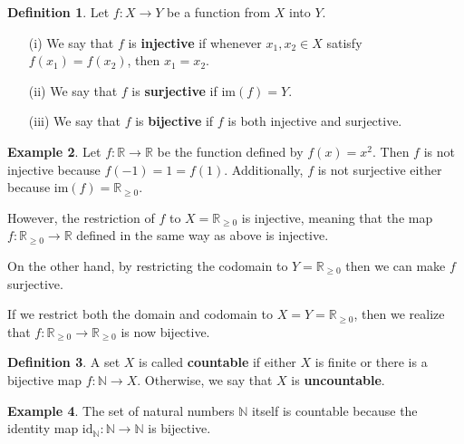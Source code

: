 \documentclass[12pt]{article}
\theoremstyle{definition}
\newtheorem{definition}{Definition}
\newtheorem{example}[definition]{Example}
\theoremstyle{theorem}
\begin{document}
\begin{definition}
Let $f : X \to Y$ be a function from $X$ into $Y$. 
\begin{enumerate}
\item[(i)] We say that $f$ is \textbf{injective} if whenever $x_1, x_2 \in X$ satisfy $f(x_1) = f(x_2)$, then $x_1 = x_2$. 
\item[(ii)] We say that $f$ is \textbf{surjective} if $\text{im}(f) = Y$. 
\item[(iii)] We say that $f$ is \textbf{bijective} if $f$ is both injective and surjective. 
\end{enumerate}
\end{definition}

\begin{example}
Let $f : \mathbb{R} \to \mathbb{R}$ be the function defined by $f(x) = x^2$. Then $f$ is not injective because $f(-1) = 1 = f(1)$. Additionally, $f$ is not surjective either because $\text{im}(f) = \mathbb{R}_{\geqslant 0}$. 

However, the restriction of $f$ to $X = \mathbb{R}_{\geqslant 0}$ is injective, meaning that the map $f : \mathbb{R}_{\geqslant 0} \to \mathbb{R}$ defined in the same way as above is injective. 

On the other hand, by restricting the codomain to $Y = \mathbb{R}_{\geqslant 0}$ then we can make $f$ surjective. 

If we restrict both the domain and codomain to $X = Y = \mathbb{R}_{\geqslant 0}$, then we realize that $f : \mathbb{R}_{\geqslant 0} \to \mathbb{R}_{\geqslant 0}$ is now bijective. 
\end{example}

\begin{definition}
A set $X$ is called \textbf{countable} if either $X$ is finite or there is a bijective map $f : \mathbb{N} \to X$. Otherwise, we say that $X$ is \textbf{uncountable}.
\end{definition}

\begin{example}
The set of natural numbers $\mathbb{N}$ itself is countable because the identity map $\text{id}_{\mathbb{N}} : \mathbb{N} \to \mathbb{N}$ is bijective. 
\end{example}
\end{document}
